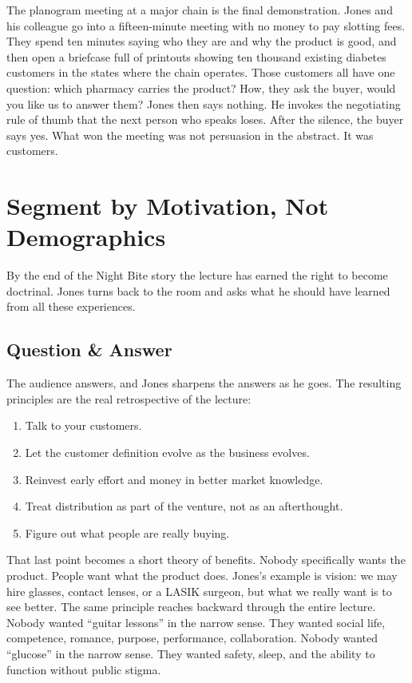 The planogram meeting at a major chain is the final demonstration. Jones and his colleague go into a fifteen-minute meeting with no money to pay slotting fees. They spend ten minutes saying who they are and why the product is good, and then open a briefcase full of printouts showing ten thousand existing diabetes customers in the states where the chain operates. Those customers all have one question: which pharmacy carries the product? How, they ask the buyer, would you like us to answer them? Jones then says nothing. He invokes the negotiating rule of thumb that the next person who speaks loses. After the silence, the buyer says yes. What won the meeting was not persuasion in the abstract. It was customers.

\section{Segment by Motivation, Not Demographics}

By the end of the Night Bite story the lecture has earned the right to become doctrinal. Jones turns back to the room and asks what he should have learned from all these experiences.

\subsection{Question \& Answer}

The audience answers, and Jones sharpens the answers as he goes. The resulting principles are the real retrospective of the lecture:
\begin{enumerate}
\item Talk to your customers.
\item Let the customer definition evolve as the business evolves.
\item Reinvest early effort and money in better market knowledge.
\item Treat distribution as part of the venture, not as an afterthought.
\item Figure out what people are really buying.
\end{enumerate}

That last point becomes a short theory of benefits. Nobody specifically wants the product. People want what the product does. Jones's example is vision: we may hire glasses, contact lenses, or a LASIK surgeon, but what we really want is to see better. The same principle reaches backward through the entire lecture. Nobody wanted ``guitar lessons'' in the narrow sense. They wanted social life, competence, romance, purpose, performance, collaboration. Nobody wanted ``glucose'' in the narrow sense. They wanted safety, sleep, and the ability to function without public stigma.


